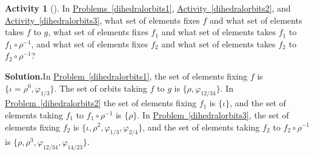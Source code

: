 \documentclass[10pt,]{book}
\theoremstyle{plain}
\theoremstyle{definition}
\newtheorem{activity}[project]{Activity}
\numberwithin{equation}{chapter}
\begin{document}
\begin{activity}[]\label{fixandmove}
In \hyperref[dihedralorbits1]{Problems~\ref{dihedralorbits1}}, \hyperref[dihedralorbits2]{Activity~\ref{dihedralorbits2}}, and \hyperref[dihedralorbits3]{Activity~\ref{dihedralorbits3}}, what set of elements fixes \(f\) and what set of elements takes \(f\) to \(g\), what set of elements fixes \(f_1\) and what set of elements takes \(f_1\) to \(f_1\circ\rho^{-1}\), and what set of elements fixes \(f_2\) and what set of elements takes \(f_2\) to \(f_2\circ\rho^{-1}\)?%
\par\medskip\noindent%
\textbf{Solution.}\quad In \hyperref[dihedralorbits1]{Problem~\ref{dihedralorbits1}}, the set of elements fixing \(f\) is \(\{\iota=\rho^0, \varphi_{1/3}\}\). The set of orbits taking \(f\) to \(g\) is \(\{\rho, \varphi_{12/34}\}\). In \hyperref[dihedralorbits2]{Problem~\ref{dihedralorbits2}} the set of elements fixing \(f_1\) is \(\{\iota\}\), and the set of elements taking \(f_1\) to \(f_1\circ\rho^{-1}\) is \(\{\rho\}\). In \hyperref[dihedralorbits3]{Problem~\ref{dihedralorbits3}}, the set of elements fixing \(f_2\) is \(\{\iota,\rho^2,
\varphi_{1/3}, \varphi_{2/4}\}\), and the set of elements taking \(f_2\) to \(f_2\circ\rho^{-1}\) is \(\{\rho,
\rho^3, \varphi_{12/34}, \varphi_{14/23}\}\).%
\end{activity}
\end{document}
